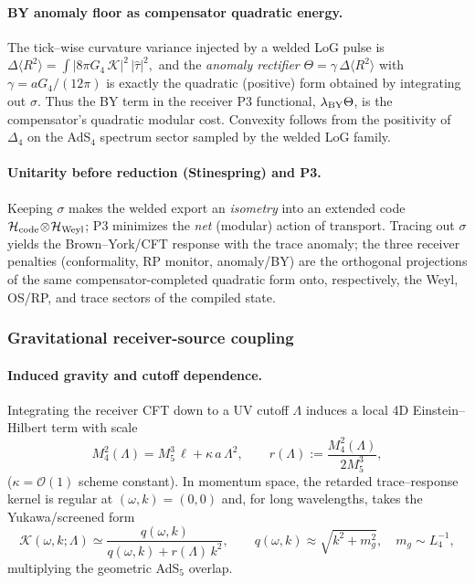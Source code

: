 \documentclass[10pt]{article}
\theoremstyle{definition}
\theoremstyle{plain}
\begin{document}
\paragraph{BY anomaly floor as compensator quadratic energy.}\label{par:uom-main-043}
The tick–wise curvature variance injected by a welded LoG pulse is
\(
\Delta\!\langle R^2\rangle
=\!\int \!|8\pi G_4\,\mathcal K|^2\,|\widehat{\tau}|^2,
\)
and the \emph{anomaly rectifier}
\(
\Theta=\gamma\,\Delta\!\langle R^2\rangle
\)
with $\gamma\!=\!aG_4/(12\pi)$ is exactly the quadratic (positive) form obtained by integrating out
$\sigma$. Thus the BY term in the receiver P3 functional,
$\lambda_{\rm BY}\Theta$, is the compensator’s quadratic modular cost.
Convexity follows from the positivity of $\Delta_4$ on the AdS$_4$ spectrum sector sampled
by the welded LoG family.

\paragraph{Unitarity before reduction (Stinespring) and P3.}\label{par:uom-main-044}
Keeping $\sigma$ makes the welded export an \emph{isometry} into an extended code
$\mathcal H_{\rm code}\!\otimes\!\mathcal H_{\rm Weyl}$; P3 minimizes the \emph{net}
(modular) action of transport. Tracing out $\sigma$ yields the Brown–York/CFT response with the
trace anomaly; the three receiver penalties (conformality, RP monitor, anomaly/BY) are the
orthogonal projections of the same compensator-completed quadratic form onto, respectively,
the Weyl, OS/RP, and trace sectors of the compiled state.

\subsubsection*{Gravitational receiver-source coupling}
\label{subsubsec:gravitational-receiver-source-coupling}
\paragraph{Induced gravity and cutoff dependence.}\label{par:uom-main-045}
Integrating the receiver CFT down to a UV cutoff $\Lambda$ induces a local 4D Einstein–Hilbert
term with scale
\begin{equation}
M_{4}^2(\Lambda)=M_5^3\,\ell+\kappa\,a\,\Lambda^2,
\qquad
r(\Lambda):=\frac{M_4^2(\Lambda)}{2M_5^3},
\label{eq:induced-grav}
\end{equation}
($\kappa=\mathcal O(1)$ scheme constant). In momentum space, the retarded trace–response kernel
is regular at $(\omega,k)\!=\!(0,0)$ and, for long wavelengths, takes the Yukawa/screened form
\begin{equation}
\mathcal K(\omega,k;\Lambda)
\simeq \frac{q(\omega,k)}{q(\omega,k)+r(\Lambda)\,k^2},
\qquad
q(\omega,k)\approx \sqrt{k^2+m_g^2},\quad m_g\sim L_4^{-1},
\label{eq:K-screen}
\end{equation}
multiplying the geometric AdS$_5$ overlap.
\end{document}
